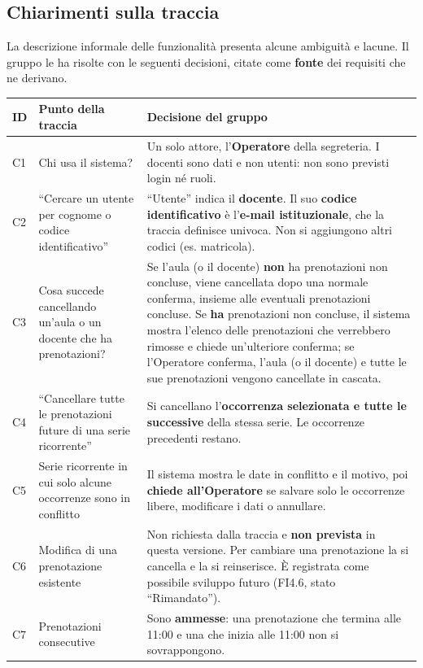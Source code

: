 \subsection{Chiarimenti sulla traccia}
La descrizione informale delle funzionalità presenta alcune ambiguità e lacune. Il gruppo le ha risolte con le seguenti decisioni, citate come \textbf{fonte} dei requisiti che ne derivano.

\begin{longtable}{|l|P{3.0cm}|P{7.2cm}|}\hline
\textbf{ID} & \textbf{Punto della traccia} & \textbf{Decisione del gruppo} \\ \hline
\endhead
C1 & Chi usa il sistema? & Un solo attore, l'\textbf{Operatore} della segreteria. I docenti sono dati e non utenti: non sono previsti login né ruoli. \\ \hline
C2 & ``Cercare un utente per cognome o codice identificativo'' & ``Utente'' indica il \textbf{docente}. Il suo \textbf{codice identificativo} è l'\textbf{e-mail istituzionale}, che la traccia definisce univoca. Non si aggiungono altri codici (es. matricola). \\ \hline
C3 & Cosa succede cancellando un'aula o un docente che ha prenotazioni? & Se l'aula (o il docente) \textbf{non} ha prenotazioni non concluse, viene cancellata dopo una normale conferma, insieme alle eventuali prenotazioni concluse. Se \textbf{ha} prenotazioni non concluse, il sistema mostra l'elenco delle prenotazioni che verrebbero rimosse e chiede un'ulteriore conferma; se l'Operatore conferma, l'aula (o il docente) e tutte le sue prenotazioni vengono cancellate in cascata. \\ \hline
C4 & ``Cancellare tutte le prenotazioni future di una serie ricorrente'' & Si cancellano l'\textbf{occorrenza selezionata e tutte le successive} della stessa serie. Le occorrenze precedenti restano. \\ \hline
C5 & Serie ricorrente in cui solo alcune occorrenze sono in conflitto & Il sistema mostra le date in conflitto e il motivo, poi \textbf{chiede all'Operatore} se salvare solo le occorrenze libere, modificare i dati o annullare. \\ \hline
C6 & Modifica di una prenotazione esistente & Non richiesta dalla traccia e \textbf{non prevista} in questa versione. Per cambiare una prenotazione la si cancella e la si reinserisce. È registrata come possibile sviluppo futuro (FI4.6, stato ``Rimandato''). \\ \hline
C7 & Prenotazioni consecutive & Sono \textbf{ammesse}: una prenotazione che termina alle 11:00 e una che inizia alle 11:00 non si sovrappongono. \\ \hline

\end{longtable}
